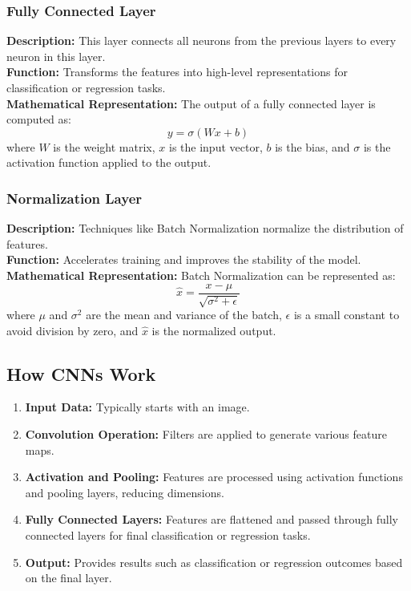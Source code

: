 \documentclass{article}
\begin{document}
\subsubsection{Fully Connected Layer}
\textbf{Description:} This layer connects all neurons from the previous layers to every neuron in this layer. \\
\textbf{Function:} Transforms the features into high-level representations for classification or regression tasks. \\
\textbf{Mathematical Representation:}
The output of a fully connected layer is computed as:
\begin{equation}
    y = \sigma(Wx + b)
\end{equation}
where \( W \) is the weight matrix, \( x \) is the input vector, \( b \) is the bias, and \( \sigma \) is the activation function applied to the output.

\subsubsection{Normalization Layer}
\textbf{Description:} Techniques like Batch Normalization normalize the distribution of features. \\
\textbf{Function:} Accelerates training and improves the stability of the model. \\
\textbf{Mathematical Representation:}
Batch Normalization can be represented as:
\begin{equation}
    \hat{x} = \frac{x - \mu}{\sqrt{\sigma^2 + \epsilon}}
\end{equation}
where \( \mu \) and \( \sigma^2 \) are the mean and variance of the batch, \( \epsilon \) is a small constant to avoid division by zero, and \( \hat{x} \) is the normalized output.

\subsection{How CNNs Work}

\begin{enumerate}
    \item \textbf{Input Data:} Typically starts with an image.
    \item \textbf{Convolution Operation:} Filters are applied to generate various feature maps.
    \item \textbf{Activation and Pooling:} Features are processed using activation functions and pooling layers, reducing dimensions.
    \item \textbf{Fully Connected Layers:} Features are flattened and passed through fully connected layers for final classification or regression tasks.
    \item \textbf{Output:} Provides results such as classification or regression outcomes based on the final layer.
\end{enumerate}
\end{document}

